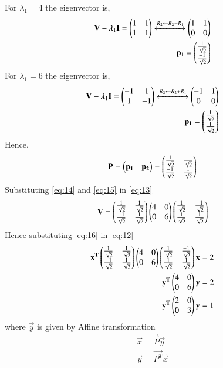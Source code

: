 \documentclass[journal,12pt,twocolumn]{IEEEtran}
\begin{document}
For $\lambda_1 = 4$  the eigenvector is,
\begin{align}
\mathbf{V}-\lambda_1\mathbf{I}= \begin{pmatrix}1&1\\1&1\end{pmatrix} \xleftrightarrow[]{R_2 \leftarrow R_2-R_1}\begin{pmatrix}1&1\\0&0\end{pmatrix}\\
\mathbf{p_1}=\begin{pmatrix}\frac{1}{\sqrt{2}}\\\frac{-1}{\sqrt{2}}\end{pmatrix}
\end{align}
For $\lambda_1 = 6$  the eigenvector is,
\begin{align}
\mathbf{V}-\lambda_1\mathbf{I}= \begin{pmatrix}-1&1\\1&-1\end{pmatrix} \xleftrightarrow[]{R_2 \leftarrow R_2+R_1}\begin{pmatrix}-1&1\\0&0\end{pmatrix}\\
\mathbf{p_1}=\begin{pmatrix}\frac{1}{\sqrt{2}}\\\frac{1}{\sqrt{2}}\end{pmatrix}
\end{align}
Hence,
\begin{align}
\mathbf{P} =\begin{pmatrix}\mathbf{p_1}&\mathbf{p_2}\end{pmatrix} = \begin{pmatrix}\frac{1}{\sqrt{2}}&\frac{1}{\sqrt{2}}\\\frac{-1}{\sqrt{2}}&\frac{1}{\sqrt{2}}\end{pmatrix} \label{eq:15}
\end{align}
Substituting \eqref{eq:14} and \eqref{eq:15} in \eqref{eq:13}
\begin{align}
\mathbf{V}= \begin{pmatrix}\frac{1}{\sqrt{2}}&\frac{1}{\sqrt{2}}\\\frac{-1}{\sqrt{2}}&\frac{1}{\sqrt{2}}\end{pmatrix}\begin{pmatrix}4&0\\0&6\end{pmatrix}\begin{pmatrix}\frac{1}{\sqrt{2}}&\frac{-1}{\sqrt{2}}\\\frac{1}{\sqrt{2}}&\frac{1}{\sqrt{2}}\end{pmatrix}\label{eq:16}
\end{align}
Hence substituting \eqref{eq:16} in \eqref{eq:12}
\begin{align}
\mathbf{x^T}\begin{pmatrix}\frac{1}{\sqrt{2}}&\frac{1}{\sqrt{2}}\\\frac{-1}{\sqrt{2}}&\frac{1}{\sqrt{2}}\end{pmatrix}\begin{pmatrix}4&0\\0&6\end{pmatrix}\begin{pmatrix}\frac{1}{\sqrt{2}}&\frac{-1}{\sqrt{2}}\\\frac{1}{\sqrt{2}}&\frac{1}{\sqrt{2}}\end{pmatrix}\mathbf{x}=2\\
\mathbf{y^T}\begin{pmatrix}4&0\\0&6\end{pmatrix}\mathbf{y}=2\\
\mathbf{y^T}\begin{pmatrix}2&0\\0&3\end{pmatrix}\mathbf{y}=1\label{eq:17}
\end{align}
where $\vec{y}$ is given by Affine transformation
\begin{align}
\vec{x}=\vec{P}\vec{y} \\
\vec{y}=\vec{P^T}\vec{x} \label{eq:22}
\end{align}
\end{document}
